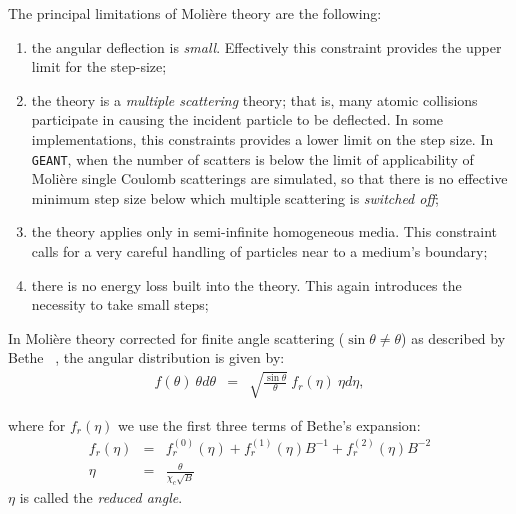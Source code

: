 The principal limitations of Moli\`{e}re theory are the following:
\begin{enumerate}
\item the angular deflection is {\it small}. Effectively this
constraint provides the upper limit for the step-size;
\item the theory is a {\it multiple scattering} theory; that is, many
atomic collisions participate in causing the incident particle to be
deflected. In some implementations, this constraints provides a lower 
limit on the step size. In {\tt GEANT}, when the number of scatters is
below the limit of applicability of Moli\`{e}re single Coulomb scatterings
are simulated, so that there is no effective minimum step size below which
multiple scattering is {\it switched off};
\item the theory applies only in semi-infinite homogeneous media. This 
constraint calls for a very careful handling of particles near to a
medium's boundary;
\item there is no energy loss built into the theory. This again introduces
the necessity to take small steps;
\end{enumerate}

In Moli\`{e}re theory corrected for finite angle
scattering ($\sin\theta \neq \theta$) as described by 
Bethe~%
                {\cite{bib-BET1} \cite{bib-SCOT}},
the angular distribution is given by:
\begin{eqnarray}
      f(\theta) \: \theta d\theta & = & \sqrt{\frac{\sin\theta}{\theta}} \:
f_r(\eta) \: \eta d\eta,
\end{eqnarray}
 
where for $f_r(\eta)$ we use the first three terms of Bethe's expansion:
\begin{eqnarray}
\label{eq:phys325-1}
f_r(\eta) & = & f_{r}^{(0)}(\eta)+
f_{r}^{(1)}(\eta)B^{-1}+f_{r}^{(2)}(\eta)B^{-2} \\
\eta & = & \frac{\theta}{\chi_c \sqrt{ B }} \nonumber
\end{eqnarray}
$\eta$ is called the {\it reduced angle}.

